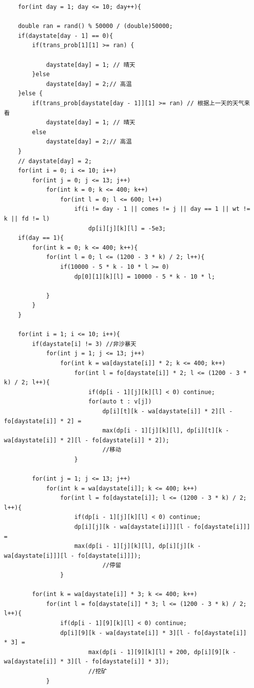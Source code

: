 \begin{verbatim}
    for(int day = 1; day <= 10; day++){

    double ran = rand() % 50000 / (double)50000;
    if(daystate[day - 1] == 0){
        if(trans_prob[1][1] >= ran) {
            
            daystate[day] = 1; // 晴天
        }else 
            daystate[day] = 2;// 高温
    }else {
        if(trans_prob[daystate[day - 1]][1] >= ran) // 根据上一天的天气来看
            daystate[day] = 1; // 晴天
        else 
            daystate[day] = 2;// 高温
    }
    // daystate[day] = 2;
    for(int i = 0; i <= 10; i++)
        for(int j = 0; j <= 13; j++)
            for(int k = 0; k <= 400; k++)
                for(int l = 0; l <= 600; l++)
                    if(i != day - 1 || comes != j || day == 1 || wt != k || fd != l)
                        dp[i][j][k][l] = -5e3;
    if(day == 1){
        for(int k = 0; k <= 400; k++){
            for(int l = 0; l <= (1200 - 3 * k) / 2; l++){
                if(10000 - 5 * k - 10 * l >= 0)
                    dp[0][1][k][l] = 10000 - 5 * k - 10 * l;
                
            }
        }
    }

    for(int i = 1; i <= 10; i++){
        if(daystate[i] != 3) //非沙暴天
            for(int j = 1; j <= 13; j++)
                for(int k = wa[daystate[i]] * 2; k <= 400; k++)   
                    for(int l = fo[daystate[i]] * 2; l <= (1200 - 3 * k) / 2; l++){
                        if(dp[i - 1][j][k][l] < 0) continue;
                        for(auto t : v[j])
                            dp[i][t][k - wa[daystate[i]] * 2][l - fo[daystate[i]] * 2] = 
                            max(dp[i - 1][j][k][l], dp[i][t][k - wa[daystate[i]] * 2][l - fo[daystate[i]] * 2]);
                            //移动
                    }
        
        for(int j = 1; j <= 13; j++)
            for(int k = wa[daystate[i]]; k <= 400; k++)   
                for(int l = fo[daystate[i]]; l <= (1200 - 3 * k) / 2; l++){
                    if(dp[i - 1][j][k][l] < 0) continue;
                    dp[i][j][k - wa[daystate[i]]][l - fo[daystate[i]]] = 
                    max(dp[i - 1][j][k][l], dp[i][j][k - wa[daystate[i]]][l - fo[daystate[i]]]);
                            //停留
                }
        
        for(int k = wa[daystate[i]] * 3; k <= 400; k++)   
            for(int l = fo[daystate[i]] * 3; l <= (1200 - 3 * k) / 2; l++){
                if(dp[i - 1][9][k][l] < 0) continue;
                dp[i][9][k - wa[daystate[i]] * 3][l - fo[daystate[i]] * 3] = 
                        max(dp[i - 1][9][k][l] + 200, dp[i][9][k - wa[daystate[i]] * 3][l - fo[daystate[i]] * 3]);
                        //挖矿
            }


\end{verbatim}

